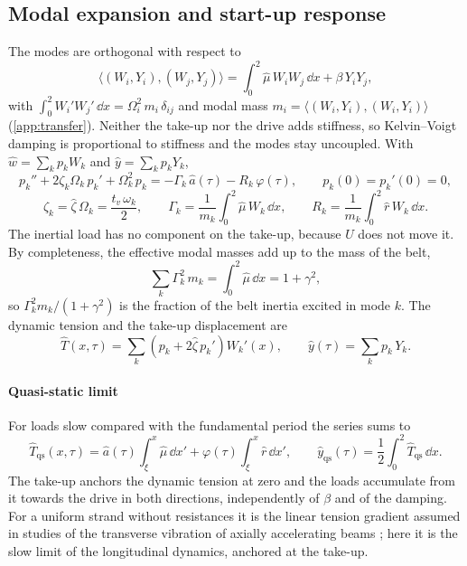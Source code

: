 \subsection{Modal expansion and start-up response}\label{sec:modal}

The modes are orthogonal with respect to
\begin{equation}\label{eq:inner}
  \bigl\langle(W_i,Y_i),(W_j,Y_j)\bigr\rangle=\int_0^2\hat\mu\,W_iW_j\,\dd x+\beta\,Y_iY_j,
\end{equation}
with $\int_0^2W_i'W_j'\,\dd x=\Omega_i^2\,m_i\,\delta_{ij}$ and modal mass
$m_i=\langle(W_i,Y_i),(W_i,Y_i)\rangle$ (\cref{app:transfer}). Neither the take-up nor the
drive adds stiffness, so Kelvin--Voigt damping is proportional to stiffness and the modes stay
uncoupled. With $\hat w=\sum_kp_kW_k$ and $\hat y=\sum_kp_kY_k$,
\begin{equation}\label{eq:modal}
  p_k''+2\zeta_k\Omega_k\,p_k'+\Omega_k^2\,p_k=-\Gamma_k\,\hat a(\tau)-R_k\,\varphi(\tau),
  \qquad p_k(0)=p_k'(0)=0,
\end{equation}
\begin{equation}\label{eq:participation}
  \zeta_k=\hat\zeta\,\Omega_k=\frac{t_v\,\omega_k}{2},\qquad
  \Gamma_k=\frac{1}{m_k}\int_0^2\hat\mu\,W_k\,\dd x,\qquad
  R_k=\frac{1}{m_k}\int_0^2\hat r\,W_k\,\dd x .
\end{equation}
The inertial load has no component on the take-up, because $U$ does not move it. By
completeness, the effective modal masses add up to the mass of the belt,
\begin{equation}\label{eq:parseval}
  \sum_k\Gamma_k^2\,m_k=\int_0^2\hat\mu\,\dd x=1+\gamma^2,
\end{equation}
so $\Gamma_k^2m_k/(1+\gamma^2)$ is the fraction of the belt inertia excited in mode $k$. The
dynamic tension and the take-up displacement are
\begin{equation}\label{eq:outputs}
  \hat T(x,\tau)=\sum_k\left(p_k+2\hat\zeta\,p_k'\right)W_k'(x),\qquad
  \hat y(\tau)=\sum_kp_k\,Y_k .
\end{equation}

\paragraph{Quasi-static limit} For loads slow compared with the fundamental period the series
sums to
\begin{equation}\label{eq:quasistatic}
  \hat T_{\mathrm{qs}}(x,\tau)=\hat a(\tau)\int_\xi^x\hat\mu\,\dd x'
  +\varphi(\tau)\int_\xi^x\hat r\,\dd x',\qquad
  \hat y_{\mathrm{qs}}(\tau)=\frac12\int_0^2\hat T_{\mathrm{qs}}\,\dd x .
\end{equation}
The take-up anchors the dynamic tension at zero and the loads accumulate from it towards the
drive in both directions, independently of $\beta$ and of the damping. For a uniform strand
without resistances it is the linear tension gradient assumed in studies of the transverse
vibration of axially accelerating beams \citep[Eq.~13a]{tang2013}; here it is the slow limit of
the longitudinal dynamics, anchored at the take-up.

